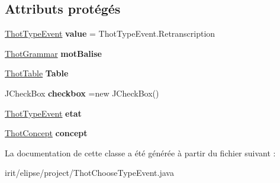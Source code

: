 \subsection*{Attributs protégés}
\begin{DoxyCompactItemize}
\item 
\mbox{\label{classfr_1_1irit_1_1elipse_1_1project_1_1_thot_choose_type_event_a67c6a45c334f25f32f1d6427ea2edfd3}} 
\mbox{\hyperlink{enumfr_1_1irit_1_1elipse_1_1project_1_1_thot_type_event}{Thot\+Type\+Event}} {\bfseries value} = Thot\+Type\+Event.\+Retranscription
\item 
\mbox{\label{classfr_1_1irit_1_1elipse_1_1project_1_1_thot_choose_type_event_a83f790907a85ddb838e7bd24e51c4e7c}} 
\mbox{\hyperlink{classfr_1_1irit_1_1elipse_1_1project_1_1_thot_grammar}{Thot\+Grammar}} {\bfseries mot\+Balise}
\item 
\mbox{\label{classfr_1_1irit_1_1elipse_1_1project_1_1_thot_choose_type_event_abe6e87e177677a2aefb2858759acd4fe}} 
\mbox{\hyperlink{classfr_1_1irit_1_1elipse_1_1project_1_1_thot_table}{Thot\+Table}} {\bfseries Table}
\item 
\mbox{\label{classfr_1_1irit_1_1elipse_1_1project_1_1_thot_choose_type_event_ac537d285d10e673f9b675edaf8a5b629}} 
J\+Check\+Box {\bfseries checkbox} =new J\+Check\+Box()
\item 
\mbox{\label{classfr_1_1irit_1_1elipse_1_1project_1_1_thot_choose_type_event_a31231945ec5ee7e97f24923c1999ee4a}} 
\mbox{\hyperlink{enumfr_1_1irit_1_1elipse_1_1project_1_1_thot_type_event}{Thot\+Type\+Event}} {\bfseries etat}
\item 
\mbox{\label{classfr_1_1irit_1_1elipse_1_1project_1_1_thot_choose_type_event_aad5631952efa6abc7a9520759b0787a9}} 
\mbox{\hyperlink{classfr_1_1irit_1_1elipse_1_1project_1_1_thot_concept}{Thot\+Concept}} {\bfseries concept}
\end{DoxyCompactItemize}


La documentation de cette classe a été générée à partir du fichier suivant \+:\begin{DoxyCompactItemize}
\item 
irit/elipse/project/Thot\+Choose\+Type\+Event.\+java\end{DoxyCompactItemize}
